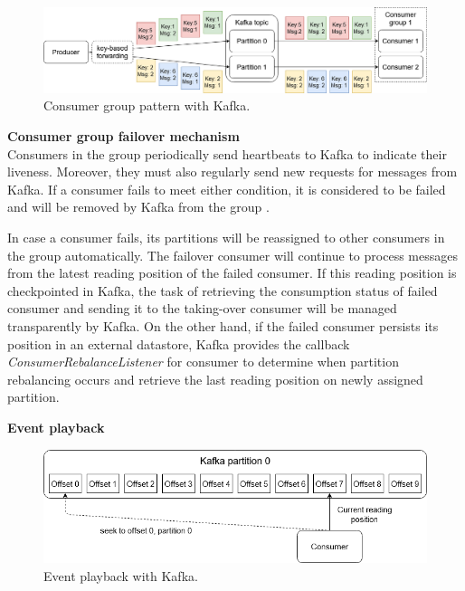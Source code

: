 \begin{figure}[h]
	\centering
	\includegraphics[width=\linewidth]{images/consumer-group-kafka.png}
	\caption{Consumer group pattern with Kafka.}
	\label{fig:kafkaconsumergroup}
\end{figure}


\textbf{Consumer group failover mechanism}\\
Consumers in the group periodically send heartbeats to Kafka to indicate their liveness. Moreover, they must also regularly send new requests for messages from Kafka. If a consumer fails to meet either condition, it is considered to be failed and will be removed by Kafka from the group \cite{kafkaconsumerimplement}. 

In case a consumer fails, its partitions will be reassigned to other consumers in the group automatically. The failover consumer will continue to process messages from the latest reading position of the failed consumer. If this reading position is checkpointed in Kafka, the task of retrieving the consumption status of failed consumer and sending it to the taking-over consumer will be managed transparently by Kafka. On the other hand, if the failed consumer persists its position in an external datastore, Kafka provides the callback \emph{ConsumerRebalanceListener} for consumer to determine when partition rebalancing occurs and retrieve the last reading position on newly assigned partition.

\textbf{Event playback}\\
\begin{figure}[h]
	\centering
	\includegraphics[width=\linewidth]{images/event-playback-kafka.png}
	\caption{Event playback with Kafka.}
	\label{fig:kafkaeventplayback}
\end{figure}

